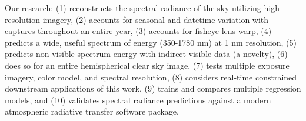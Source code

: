 Our research: (1) reconstructs the spectral radiance of the sky utilizing high resolution imagery, (2) accounts for seasonal and datetime variation with captures throughout an entire year, (3) accounts for fisheye lens warp, (4) predicts a wide, useful spectrum of energy (350-1780 nm) at 1 nm resolution, (5) predicts non-visible spectrum energy with indirect visible data (a novelty), (6) does so for an entire hemispherical clear sky image, (7) tests multiple exposure imagery, color model, and spectral resolution, (8) considers real-time constrained downstream applications of this work, (9) trains and compares multiple regression models, and (10) validates spectral radiance predictions against a modern atmospheric radiative transfer software package.

